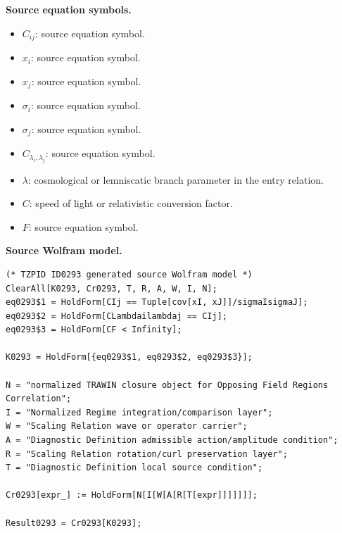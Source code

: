 \begin{minipage}[t]{0.49\linewidth}
\begingroup
\small
\raggedright
\textbf{Source equation symbols.}\par
\begin{itemize}[leftmargin=1.35em,itemsep=1pt,topsep=1pt,parsep=0pt]
    \item $C_{ij}$: source equation symbol.
    \item $x_i$: source equation symbol.
    \item $x_j$: source equation symbol.
    \item $\sigma_i$: source equation symbol.
    \item $\sigma_j$: source equation symbol.
    \item $C_{\lambda_{i},\lambda_{j}}$: source equation symbol.
    \item $\lambda$: cosmological or lemniscatic branch parameter in the entry relation.
    \item $C$: speed of light or relativistic conversion factor.
    \item $F$: source equation symbol.
\end{itemize}
\endgroup
\end{minipage}\hfill
\begin{minipage}[t]{0.47\linewidth}
\begingroup
\scriptsize
\raggedright
\textbf{Source Wolfram model.}\par
\begin{Verbatim}[fontsize=\tiny,breaklines=true,breakanywhere=true]
(* TZPID ID0293 generated source Wolfram model *)
ClearAll[K0293, Cr0293, T, R, A, W, I, N];
eq0293$1 = HoldForm[CIj == Tuple[cov[xI, xJ]]/sigmaIsigmaJ];
eq0293$2 = HoldForm[CLambdailambdaj == CIj];
eq0293$3 = HoldForm[CF < Infinity];

K0293 = HoldForm[{eq0293$1, eq0293$2, eq0293$3}];

N = "normalized TRAWIN closure object for Opposing Field Regions Correlation";
I = "Normalized Regime integration/comparison layer";
W = "Scaling Relation wave or operator carrier";
A = "Diagnostic Definition admissible action/amplitude condition";
R = "Scaling Relation rotation/curl preservation layer";
T = "Diagnostic Definition local source condition";

Cr0293[expr_] := HoldForm[N[I[W[A[R[T[expr]]]]]]];

Result0293 = Cr0293[K0293];
\end{Verbatim}
\endgroup
\end{minipage}


